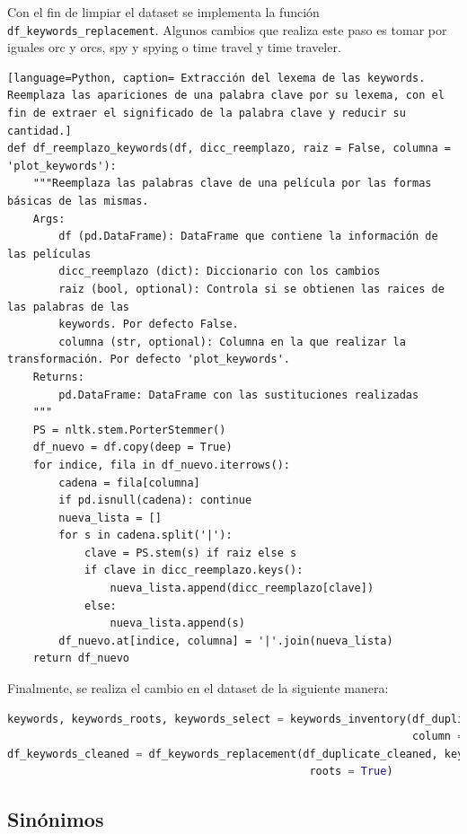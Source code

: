 Con el fin de limpiar el dataset se implementa la función \texttt{df\_keywords\_replacement}. Algunos cambios que realiza este paso es tomar por iguales orc y orcs, spy y spying o time travel y time traveler.
\begin{lstlisting}[language=Python, caption= Extracción del lexema de las keywords. Reemplaza las apariciones de una palabra clave por su lexema, con el fin de extraer el significado de la palabra clave y reducir su cantidad.]
def df_reemplazo_keywords(df, dicc_reemplazo, raiz = False, columna = 'plot_keywords'):
    """Reemplaza las palabras clave de una película por las formas básicas de las mismas.
    Args:
        df (pd.DataFrame): DataFrame que contiene la información de las películas
        dicc_reemplazo (dict): Diccionario con los cambios
        raiz (bool, optional): Controla si se obtienen las raices de las palabras de las
        keywords. Por defecto False.
        columna (str, optional): Columna en la que realizar la transformación. Por defecto 'plot_keywords'.
    Returns:
        pd.DataFrame: DataFrame con las sustituciones realizadas
    """
    PS = nltk.stem.PorterStemmer()
    df_nuevo = df.copy(deep = True)
    for indice, fila in df_nuevo.iterrows():
        cadena = fila[columna]
        if pd.isnull(cadena): continue
        nueva_lista = []
        for s in cadena.split('|'): 
            clave = PS.stem(s) if raiz else s
            if clave in dicc_reemplazo.keys():
                nueva_lista.append(dicc_reemplazo[clave])
            else:
                nueva_lista.append(s)       
        df_nuevo.at[indice, columna] = '|'.join(nueva_lista)
    return df_nuevo
\end{lstlisting}

Finalmente, se realiza el cambio en el dataset de la siguiente manera:

\begin{lstlisting}[language=Python, caption= Sustitucion de las keywords por su forma primitiva.]
keywords, keywords_roots, keywords_select = keywords_inventory(df_duplicate_cleaned,
                                                               column = 'plot_keywords')
df_keywords_cleaned = df_keywords_replacement(df_duplicate_cleaned, keywords_select,
                                               roots = True)
\end{lstlisting}

\subsection{Sinónimos}

